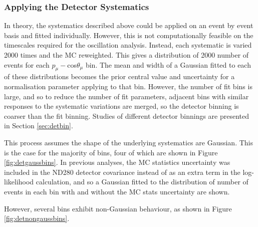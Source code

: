 \subsubsection{Applying the Detector Systematics}\label{sec:detapp}

In theory, the systematics described above could be applied on an event by event basis and fitted individually. However, this is not computationally feasible on the timescales required for the oscillation analysis. Instead, each systematic is varied 2000 times and the MC reweighted. This gives a distribution of 2000 number of events for each $p_{\mu}-$cos$\theta_{\mu}$ bin. The mean and width of a Gaussian fitted to each of these distributions becomes the prior central value and uncertainty for a normalisation parameter applying to that bin. However, the number of fit bins is large, and so to reduce the number of fit parameters, adjacent bins with similar responses to the systematic variations are merged, so the detector binning is coarser than the fit binning. Studies of different detector binnings are presented in Section \ref{sec:detbin}.

This process assumes the shape of the underlying systematics are Gaussian. This is the case for the majority of bins, four of which are shown in Figure \ref{fig:detgaussbins}. In previous analyses, the MC statistics uncertainty was included in the ND280 detector covariance instead of as an extra term in the log-likelihood calculation, and so a Gaussian fitted to the distribution of number of events in each bin with and without the MC stats uncertainty are shown.

However, several bins exhibit non-Gaussian behaviour, as shown in Figure \ref{fig:detnongaussbins}.

